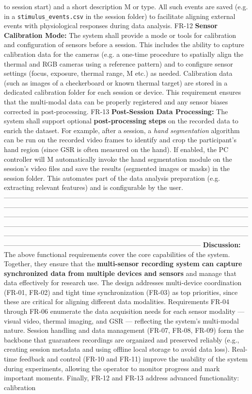to session start) and a short description M or type. All such events are saved (e.g. in a \texttt{stimulus\_events.csv} in the session folder) to facilitate aligning external events with physiological responses during data analysis. FR-12 \textbf{Sensor Calibration Mode:} The system shall provide a mode or tools for calibration and configuration of sensors before a session. This includes the ability to capture calibration data for the cameras (e.g. a one-time procedure to spatially align the thermal and RGB cameras using a reference pattern) and to configure sensor settings (focus, exposure, thermal range, M etc.) as needed. Calibration data (such as images of a checkerboard or known thermal target) are stored in a dedicated calibration folder for each session or device. This requirement ensures that the multi-modal data can be properly registered and any sensor biases corrected in post-processing. FR-13 \textbf{Post-Session Data Processing:} The system shall support optional \textbf{post-processing steps} on the recorded data to enrich the dataset. For example, after a session, a \textit{hand segmentation} algorithm can be run on the recorded video frames to identify and crop the participant's hand region (since GSR is often measured on the hand). If enabled, the PC controller will M automatically invoke the hand segmentation module on the session's video files and save the results (segmented images or masks) in the session folder. This automates part of the data analysis preparation (e.g. extracting relevant features) and is configurable by the user. --------------------------------------------------------------------------------------------------------------------------------------------------------------------------------------------------------------------------------------------------------------------------------------------------------------------------------------------------------------------------------------------------------------------------------------------------------------------------------------------------------------------------------------------------------------------------------------------------------------------------------------------------- \textbf{Discussion:} The above functional requirements cover the core capabilities of the system. Together, they ensure that the \textbf{multi-sensor recording system can capture synchronized data from multiple devices and sensors} and manage that data effectively for research use. The design addresses multi-device coordination (FR-01, FR-02) and tight time synchronization (FR-03) as top priorities, since these are critical for aligning different data modalities. Requirements FR-04 through FR-06 enumerate the data acquisition needs for each sensor modality --- visual video, thermal imaging, and GSR --- reflecting the system's multi-modal nature. Session handling and data management (FR-07, FR-08, FR-09) form the backbone that guarantees recordings are organized and preserved reliably (e.g., creating session metadata and using offline local storage to avoid data loss). Real-time feedback and control (FR-10 and FR-11) improve the usability of the system during experiments, allowing the operator to monitor progress and mark important moments. Finally, FR-12 and FR-13 address advanced functionality: calibration 